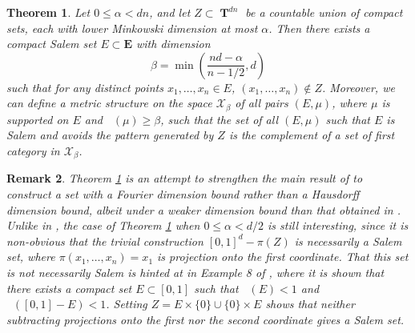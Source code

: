 \documentclass[12pt,reqno]{article}
\numberwithin{equation}{section}
\DeclareMathOperator{\minkdim}{\dim_{\mathbf{M}}}
\DeclareMathOperator{\fordim}{\dim_{\mathbf{F}}}
\DeclareMathOperator{\TT}{\mathbf{T}}
\newtheorem{theorem}{Theorem}
\newtheorem{remark}[theorem]{Remark}
\numberwithin{theorem}{section}
\begin{document}
\begin{theorem} \label{maintheorem}
    Let $0 \leq \alpha < dn$, and let $Z \subset \TT^{dn}$ be a countable union of compact sets, each with lower Minkowski dimension at most $\alpha$. Then there exists a compact Salem set $E \subset \mathbf{E}$ with dimension
    \[ \beta = \min \left( \frac{nd - \alpha}{n-1/2}, d \right) \]
    such that for any distinct points $x_1, \dots, x_n \in E$, $(x_1, \dots, x_n) \not \in Z$.  Moreover, we can define a metric structure on the space $\mathcal{X}_\beta$ of all pairs $(E,\mu)$, where $\mu$ is supported on $E$ and $\fordim(\mu) \geq \beta$, such that the set of all $(E,\mu)$ such that $E$ is Salem and avoids the pattern generated by $Z$ is the complement of a set of first category in $\mathcal{X}_\beta$.
\end{theorem}

\begin{remark}
    Theorem \ref{maintheorem} is an attempt to strengthen the main result of \cite{OurPaper} to construct a set with a Fourier dimension bound rather than a Hausdorff dimension bound, albeit under a weaker dimension bound than that obtained in \cite{OurPaper}. Unlike in \cite{OurPaper}, the case of Theorem \ref{maintheorem} when $0 \leq \alpha < d/2$ is still interesting, since it is non-obvious that the trivial construction $[0,1]^d - \pi(Z)$ is necessarily a Salem set, where $\pi(x_1,\dots,x_n) = x_1$ is projection onto the first coordinate. That this set is not necessarily Salem is hinted at in Example 8 of \cite{Ekstrom2014}, where it is shown that there exists a compact set $E \subset [0,1]$ such that $\minkdim(E) < 1$ and $\fordim([0,1] - E) < 1$. Setting $Z = E \times \{ 0 \} \cup \{ 0 \} \times E$ shows that neither subtracting projections onto the first nor the second coordinate gives a Salem set.
\end{remark}
\end{document}
